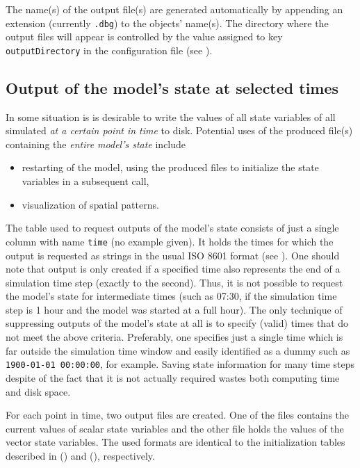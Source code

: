 The name(s) of the output file(s) are generated automatically by appending an extension (currently \texttt{.dbg}) to the objects' name(s). The directory where the output files will appear is controlled by the value assigned to key \verb!outputDirectory! in the configuration file (see ).

\subsection{Output of the model's state at selected times}  \label{sec:input-outputState} 

In some situation is is desirable to write the values of all state variables of all simulated \emph{at a certain point in time} to disk. Potential uses of the produced file(s) containing the \emph{entire model's state} include
\begin{itemize}
  \item restarting of the model, using the produced files to initialize the state variables in a subsequent call,
  \item visualization of spatial patterns.
\end{itemize}

The table used to request outputs of the model's state consists of just a single column with name \verb!time! (no example given). It holds the times for which the output is requested as strings in the usual ISO 8601 format (see ). One should note that output is only created if a specified time also represents the end of a simulation time step (exactly to the second). Thus, it is not possible to request the model's state for intermediate times (such as 07:30, if the simulation time step is 1 hour and the model was started at a full hour).
The only technique of suppressing outputs of the model's state at all is to specify (valid) times that do not meet the above criteria. Preferably, one specifies just a single time which is far outside the simulation time window and easily identified as a dummy such as \verb!1900-01-01 00:00:00!, for example. Saving state information for many time steps despite of the fact that it is not actually required wastes both computing time and disk space.

For each point in time, two output files are created. One of the files contains the current values of scalar state variables and the other file holds the values of the vector state variables. The used formats are identical to the initialization tables described in  () and  (), respectively.


